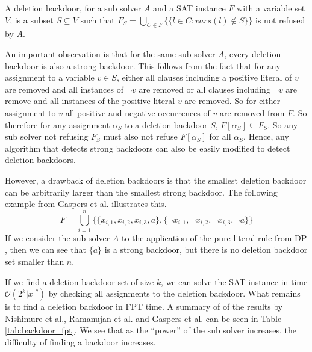 \begin{definition}
    A deletion backdoor, for a sub solver $A$ and a SAT instance $F$
    with a variable set $V$, is a subset $S \subseteq V$ such that
    $F_S = \bigcup_{C \in F}\{\{l \in C : vars(l) \notin S \}\}$
    is not refused by $A$.
\end{definition}

An important observation is that for the same sub solver $A$, every
deletion backdoor is also a strong backdoor. This follows from the fact
that for any assignment to a variable $v \in S$, either all clauses including
a positive literal of $v$ are removed and all instances of $\neg v$ are removed
or all clauses including $\neg v$ are remove and all instances of the positive
literal $v$ are removed. So for either assignment to $v$ all positive and
negative occurrences of $v$ are removed from $F$. So therefore for any
assignment $\alpha_S$ to a deletion backdoor $S$, $F[\alpha_S] \subseteq F_S$.
So any sub solver not refusing $F_S$ must also not refuse $F[\alpha_S]$ for
all $\alpha_S$. Hence, any algorithm that detects strong backdoors can
also be easily modified to detect deletion backdoors.

However, a drawback of deletion backdoors is that the smallest deletion
backdoor can be arbitrarily larger than the smallest strong backdoor.
The following example from Gaspers et al. illustrates this.
\begin{equation}
    F = \bigcup_{i = 1}^{n} \{\{x_{i,1}, x_{i,2}, x_{i,3}, a\},
    \{\neg x_{i,1}, \neg x_{i,2}, \neg x_{i,3}, \neg a\}\}
\end{equation}
If we consider the sub solver $A$ to the application of the
pure literal rule from DP \cite{davis1960computing}, then we can see
that $\{a\}$ is a strong backdoor, but there is no deletion backdoor set
smaller than $n$.

If we find a deletion backdoor set of size $k$, we can
solve the SAT instance in time $\mathcal{O}(2^{k}|x|^{c})$ by checking
all assignments to the deletion backdoor. What remains is to find
a deletion backdoor in FPT time.
A summary of of the results by
Nishimure et al., Ramanujan et al. and Gaspers et al. can be seen in Table \ref{tab:backdoor_fpt}. We see that as the ``power'' of the sub solver increases,
the difficulty of finding a backdoor increases.

